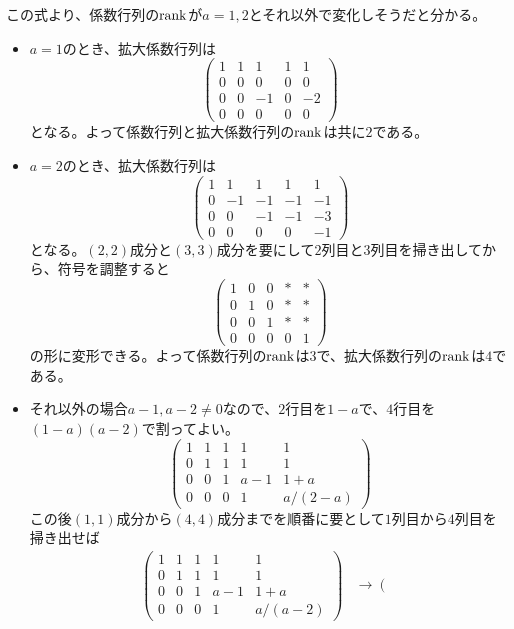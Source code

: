 この式より、係数行列の$\operatorname{rank}$が$a = 1, 2$とそれ以外で変化しそうだと分かる。
\begin{itemize}
\item $a = 1$のとき、拡大係数行列は
\[
\left(\begin{array}{cccc|c}
1 & 1 & 1 & 1 & 1 \\
0 & 0 & 0 & 0 & 0 \\
0 & 0 & -1 & 0 & - 2 \\
0 & 0 & 0 & 0 & 0
\end{array}\right)
\]
となる。よって係数行列と拡大係数行列の$\operatorname{rank}$は共に$2$である。
\item $a = 2$のとき、拡大係数行列は
\[
\left(\begin{array}{cccc|c}
1 & 1 & 1 & 1 & 1 \\
0 & -1 & -1 & -1 & -1 \\
0 & 0 & -1 & -1 & -3 \\
0 & 0 & 0 & 0 & -1
\end{array}\right)
\]
となる。$(2, 2)$成分と$(3, 3)$成分を要にして$2$列目と$3$列目を掃き出してから、符号を調整すると
\[
\left(\begin{array}{cccc|c}
1 & 0 & 0 & * & * \\
0 & 1 & 0 & * & * \\
0 & 0 & 1 & * & * \\
0 & 0 & 0 & 0 & 1
\end{array}\right)
\]
の形に変形できる。よって係数行列の$\operatorname{rank}$は$3$で、拡大係数行列の$\operatorname{rank}$は$4$である。
\item それ以外の場合$a - 1, a - 2 \neq 0$なので、$2$行目を$1 - a$で、$4$行目を$(1 - a)(a - 2)$で割ってよい。
\[
\left(\begin{array}{cccc|c}
1 & 1 & 1 & 1 & 1 \\
0 & 1 & 1 & 1 & 1 \\
0 & 0 & 1 & a - 1 & 1 + a \\
0 & 0 & 0 & 1 & a/(2 - a)
\end{array}\right)
\]
この後$(1, 1)$成分から$(4, 4)$成分までを順番に要として$1$列目から$4$列目を掃き出せば
\begin{align*}
\left(\begin{array}{cccc|c}
1 & 1 & 1 & 1 & 1 \\
0 & 1 & 1 & 1 & 1 \\
0 & 0 & 1 & a - 1 & 1 + a \\
0 & 0 & 0 & 1 & a/(a - 2)
\end{array}\right)
&\rightarrow
\left(\begin{array}{cccc|c}

\end{array}
\end{align*}
\end{itemize}
